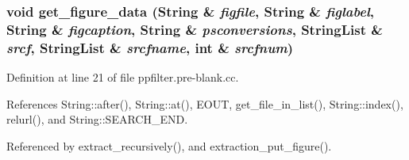 \subsubsection{\setlength{\rightskip}{0pt plus 5cm}void get\_\-figure\_\-data ({\bf String} \& {\em figfile}, {\bf String} \& {\em figlabel}, {\bf String} \& {\em figcaption}, {\bf String} \& {\em psconversions}, {\bf String\-List} \& {\em srcf}, {\bf String\-List} \& {\em srcfname}, int \& {\em srcfnum})}\label{ppfilter_8pre-blank_8cc_a1}




Definition at line 21 of file ppfilter.pre-blank.cc.

References String::after(), String::at(), EOUT, get\_\-file\_\-in\_\-list(), String::index(), relurl(), and String::SEARCH\_\-END.

Referenced by extract\_\-recursively(), and extraction\_\-put\_\-figure().



